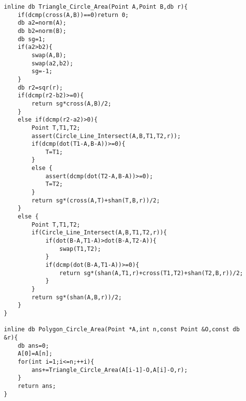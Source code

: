 \documentclass{ctexart}
\begin{document}
\begin{lstlisting}
inline db Triangle_Circle_Area(Point A,Point B,db r){
    if(dcmp(cross(A,B))==0)return 0;
    db a2=norm(A);
    db b2=norm(B);
    db sg=1;
    if(a2>b2){
        swap(A,B);
        swap(a2,b2);
        sg=-1;
    }
    db r2=sqr(r);
    if(dcmp(r2-b2)>=0){
        return sg*cross(A,B)/2;
    }
    else if(dcmp(r2-a2)>0){
        Point T,T1,T2;
        assert(Circle_Line_Intersect(A,B,T1,T2,r));
        if(dcmp(dot(T1-A,B-A))>=0){
            T=T1;
        }
        else {
            assert(dcmp(dot(T2-A,B-A))>=0);
            T=T2;
        }
        return sg*(cross(A,T)+shan(T,B,r))/2;
    }
    else {
        Point T,T1,T2;
        if(Circle_Line_Intersect(A,B,T1,T2,r)){
            if(dot(B-A,T1-A)>dot(B-A,T2-A)){
                swap(T1,T2);
            }
            if(dcmp(dot(B-A,T1-A))>=0){
                return sg*(shan(A,T1,r)+cross(T1,T2)+shan(T2,B,r))/2;
            }
        }
        return sg*(shan(A,B,r))/2;
    }
}

inline db Polygon_Circle_Area(Point *A,int n,const Point &O,const db &r){
    db ans=0;
	A[0]=A[n];
    for(int i=1;i<=n;++i){
        ans+=Triangle_Circle_Area(A[i-1]-O,A[i]-O,r);
    }
    return ans;
}    
\end{lstlisting}
\end{document}
